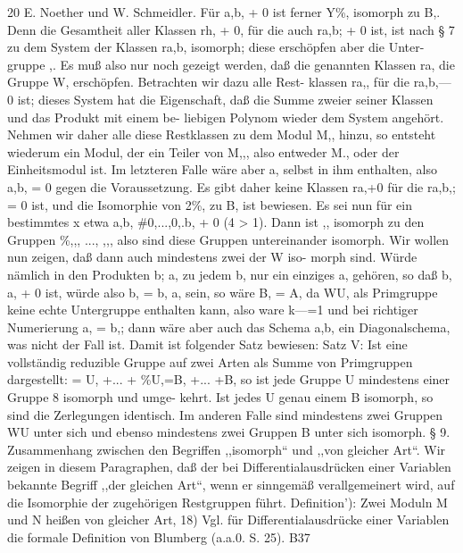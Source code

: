 \documentclass[11pt,a4paper]{article}
\theoremstyle{plain}
\theoremstyle{definition}
\begin{document}
20 
E. Noether und W. Schmeidler. 
Für a,b, + 0 ist ferner Y\%, isomorph zu B,. 
Denn die Gesamtheit 
aller Klassen rh, + 0, für die auch ra,b; + 0 ist, ist nach \S{} 7 zu dem 
System der Klassen ra,b, isomorph; 
diese erschöpfen aber die Unter- 
gruppe ,. 
Es muß also nur noch gezeigt werden, 
daß die genannten 
Klassen ra, die Gruppe W, erschöpfen. 
Betrachten 
wir dazu alle Rest- 
klassen ra,, für die ra,b,---0 
ist; dieses System hat die Eigenschaft, 
daß die Summe zweier seiner Klassen und das Produkt 
mit einem 
be- 
liebigen Polynom wieder dem System angehört. 
Nehmen wir daher alle 
diese Restklassen 
zu dem Modul M,, hinzu, 
so 
entsteht wiederum 
ein 
Modul, der ein Teiler von M,,, also entweder M., oder der Einheitsmodul 
ist. Im letzteren Falle wäre aber a, selbst in ihm enthalten, also a,b, = 0 
gegen die Voraussetzung. 
Es gibt daher keine Klassen ra,+0 für die 
ra,b,; = 0 ist, und die Isomorphie von 2\%, zu B, ist bewiesen. 
Es sei nun für ein bestimmtes x etwa a,b, \#0,...,0,.b, + 0 (4 > 1). 
Dann ist ,, isomorph zu den Gruppen \%,,, ..., ,,, also sind diese Gruppen 
untereinander isomorph. 
Wir wollen nun zeigen, daß dann auch mindestens zwei der W iso- 
morph sind. 
Würde nämlich in den Produkten b; a, zu jedem b, nur ein 
einziges a, gehören, so daß b, a, + 0 ist, würde also b, = b, a, sein, so wäre 
B, = A, da WU, als Primgruppe keine echte Untergruppe enthalten kann, 
also ware 
k---=1 und bei richtiger Numerierung a, = b,; dann wäre aber 
auch das 
Schema 
a,b, 
ein Diagonalschema, 
was 
nicht der 
Fall 
ist. 
Damit ist folgender Satz bewiesen: 
Satz V: Ist eine vollständig reduzible Gruppe  auf zwei Arten als 
Summe von Primgruppen dargestellt: = U, +... + \%U,=B, +... +B, 
so ist jede Gruppe U mindestens 
einer Gruppe 8 isomorph und umge- 
kehrt. 
Ist jedes U genau einem B isomorph, 
so sind die Zerlegungen 
identisch. 
Im anderen Falle sind mindestens zwei Gruppen WU unter 
sich und ebenso mindestens zwei Gruppen B unter sich isomorph. 
\S{} 9. 
Zusammenhang zwischen den Begriffen ,,isomorph`` und ,,von gleicher 
Art``. 
Wir zeigen in diesem Paragraphen, daß der bei Differentialausdrücken 
einer Variablen bekannte Begriff ,,der gleichen Art``, wenn 
er sinngemäß 
verallgemeinert wird, auf die Isomorphie der zugehörigen Restgruppen führt. 
Definition'): 
Zwei Moduln M und N heißen von gleicher Art, 
18) Vgl. für Differentialausdrücke einer Variablen die formale Definition 
von 
Blumberg (a.a.0. S. 25). 
B37
\end{document}
